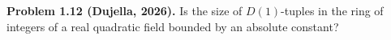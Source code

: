 \textbf{Problem 1.12 (Dujella, 2026).} Is the size of $D(1)$-tuples in the ring of integers of a real quadratic field bounded by an absolute constant?
